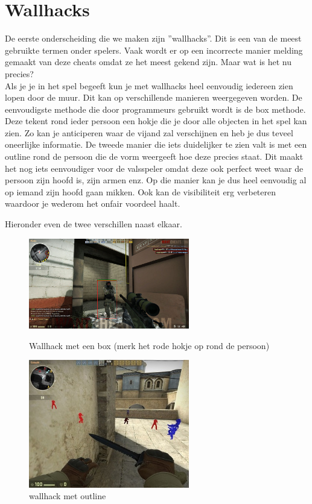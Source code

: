 \documentclass[pdftex,a4paper,12pt,twoside]{report}
\begin{document}
\section{Wallhacks}
\label{sec:walls}
De eerste onderscheiding die we maken zijn ''wallhacks''. Dit is een van de meest gebruikte termen onder spelers. Vaak wordt er op een incorrecte manier melding gemaakt van deze \gls{cheat}s omdat ze het meest gekend zijn. Maar wat is het nu precies?
\\

Als je je in het spel begeeft kun je met wallhacks heel eenvoudig iedereen zien lopen door de muur. Dit kan op verschillende manieren weergegeven worden. De eenvoudigste methode die door programmeurs gebruikt wordt is de box methode. Deze tekent rond ieder persoon een hokje die je door alle objecten in het spel kan zien. Zo kan je anticiperen waar de vijand zal verschijnen en heb je dus teveel oneerlijke informatie. 
De tweede manier die iets duidelijker te zien valt is met een outline rond de persoon die de vorm weergeeft hoe deze precies staat. Dit maakt het nog iets eenvoudiger voor de valsspeler omdat deze ook perfect weet waar de persoon zijn hoofd is, zijn armen enz. Op die manier kan je dus heel eenvoudig al op iemand zijn hoofd gaan mikken. Ook kan de visibiliteit erg verbeteren waardoor je wederom het onfair voordeel haalt.

Hieronder even de twee verschillen naast elkaar.


\begin{figure}[H]
\centering
\begin{minipage}{0.48\textwidth}
\centering
\includegraphics[width=7cm]{img/wallhack-example-box}
\caption{Wallhack met een box (merk het rode hokje op rond de persoon)}
\end{minipage}\hfill
\begin{minipage}{0.48\textwidth}
\centering
\includegraphics[width=7cm]{img/wallhack-example-outline}
\caption{wallhack met outline}
\end{minipage}
\end{figure}  
\end{document}
